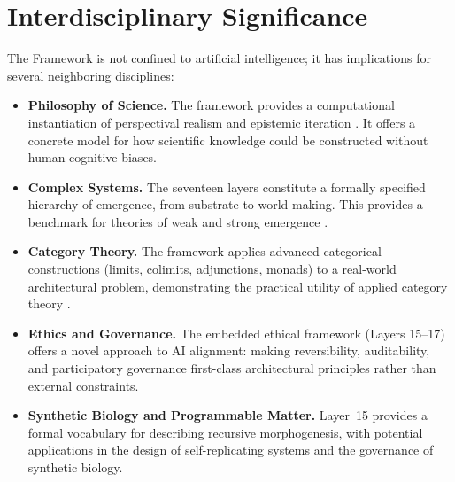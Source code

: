 \section{Interdisciplinary Significance}
\label{sec:interdisciplinary}

The \Apeiron{} Framework is not confined to artificial intelligence; it has implications for several neighboring disciplines:

\begin{itemize}
    \item \textbf{Philosophy of Science.} The framework provides a computational instantiation of perspectival realism \cite{massimi2022} and epistemic iteration \cite{chang2012}. It offers a concrete model for how scientific knowledge could be constructed without human cognitive biases.
    \item \textbf{Complex Systems.} The seventeen layers constitute a formally specified hierarchy of emergence, from substrate to world-making. This provides a benchmark for theories of weak and strong emergence \cite{bedau1997}.
    \item \textbf{Category Theory.} The framework applies advanced categorical constructions (limits, colimits, adjunctions, monads) to a real-world architectural problem, demonstrating the practical utility of applied category theory \cite{fong2019}.
    \item \textbf{Ethics and Governance.} The embedded ethical framework (Layers 15--17) offers a novel approach to AI alignment: making reversibility, auditability, and participatory governance first-class architectural principles rather than external constraints.
    \item \textbf{Synthetic Biology and Programmable Matter.} Layer~15 provides a formal vocabulary for describing recursive morphogenesis, with potential applications in the design of self-replicating systems and the governance of synthetic biology.
\end{itemize}